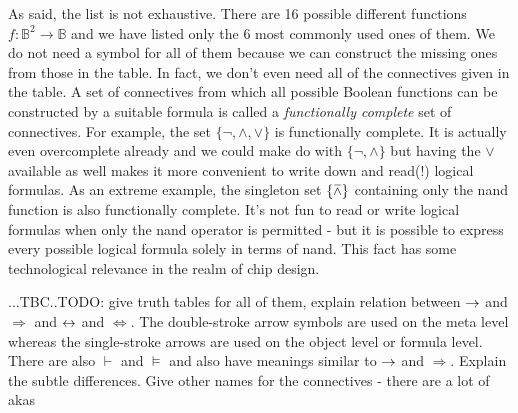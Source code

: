 As said, the list is not exhaustive. There are 16 possible different functions $f: \mathbb{B}^2 \rightarrow \mathbb{B}$ and we have listed only the $6$ most commonly used ones of them. We do not need a symbol for all of them because we can construct the missing ones from those in the table. In fact, we don't even need all of the connectives given in the table. A set of connectives from which all possible Boolean functions can be constructed by a suitable formula is called a \emph{functionally complete} set of connectives. For example, the set $\{\neg, \wedge, \vee\}$ is functionally complete. It is actually even overcomplete already and we could make do with  $\{\neg, \wedge\}$ but having the $\vee$ available as well makes it more convenient to write down and read(!) logical formulas. As an extreme example, the singleton set $\{\mathbin{\barwedge}\}$ containing only the nand function is also functionally complete. It's not fun to read or write logical formulas when only the nand operator is permitted - but it is possible to express every possible logical formula solely in terms of nand. This fact has some technological relevance in the realm of chip design.

...TBC..TODO: give truth tables for all of them, explain relation between $\mathbin{\rightarrow}$ and $\Rightarrow$ and $\mathbin{\leftrightarrow}$ and $\Leftrightarrow$. The double-stroke arrow symbols are used on the meta level whereas the single-stroke arrows are used on the object level or formula level. There are also $\vdash$ and $\vDash$ and also have meanings similar to $\mathbin{\rightarrow}$ and $\Rightarrow$. Explain the subtle differences. Give other names for the connectives - there are a lot of akas





